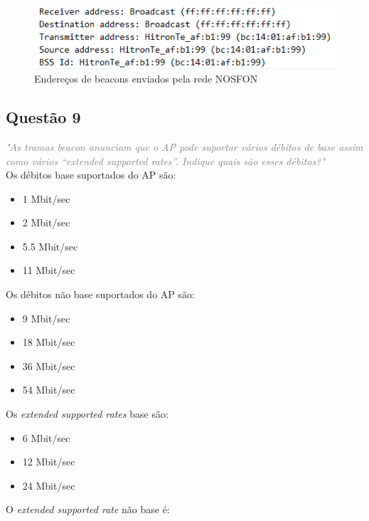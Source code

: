 \documentclass{llncs}
\newcommand{\questionE}[1]{\textcolor{gray}{\textit{"#1"}}}
\begin{document}
\begin{figure}[H]
\begin{center}
\includegraphics[width=12cm]{8nosfon.PNG}
\end{center}
\caption{Endereços de beacons enviados pela rede NOSFON}
\end{figure}

\subsection*{Questão 9}
\hspace{3mm} 
\questionE{As tramas beacon anunciam que o AP pode suportar vários débitos de base assim como vários “extended supported rates”. Indique quais são esses débitos?}\\ 

Os débitos base suportados do AP são:

\begin{itemize}
    \item 1 Mbit/sec
    \item 2 Mbit/sec
    \item 5.5 Mbit/sec
    \item 11 Mbit/sec
\end{itemize}

Os débitos não base suportados do AP são:

\begin{itemize}
    \item 9 Mbit/sec
    \item 18 Mbit/sec
    \item 36 Mbit/sec
    \item 54 Mbit/sec
\end{itemize}

Os \textit{extended supported rates} base são:

\begin{itemize}
    \item 6 Mbit/sec
    \item 12 Mbit/sec
    \item 24 Mbit/sec
\end{itemize}

O \textit{extended supported rate} não base é:
\end{document}
